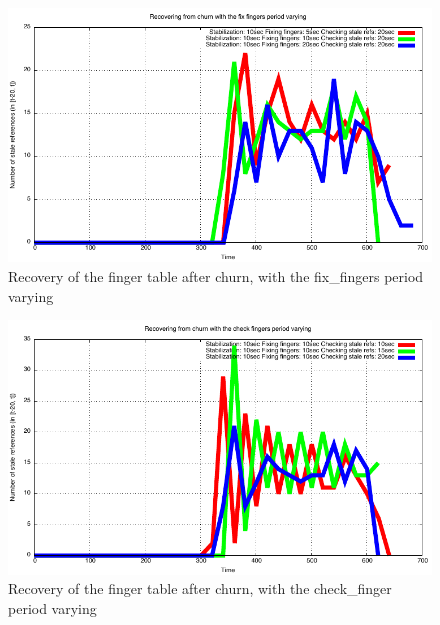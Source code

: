 \documentclass[a4paper, 11pt]{article}
\theoremstyle{plain}
\theoremstyle{definition}
\begin{document}
    
    \begin{figure}[h]
      \centering
      \includegraphics{plots/Recovery-SR-fix-fingers.pdf}
      \caption{Recovery of the finger table after churn, with the fix\_fingers period varying}
      \label{fig:Rec-SR-fix-fingers}
    \end{figure}
    
    
    \begin{figure}[h]
      \centering
      \includegraphics{plots/Recovery-SR-check-fingers.pdf}
      \caption{Recovery of the finger table after churn, with the check\_finger period varying}
      \label{fig:Rec-SR-check-finger}
    \end{figure}
\end{document}

